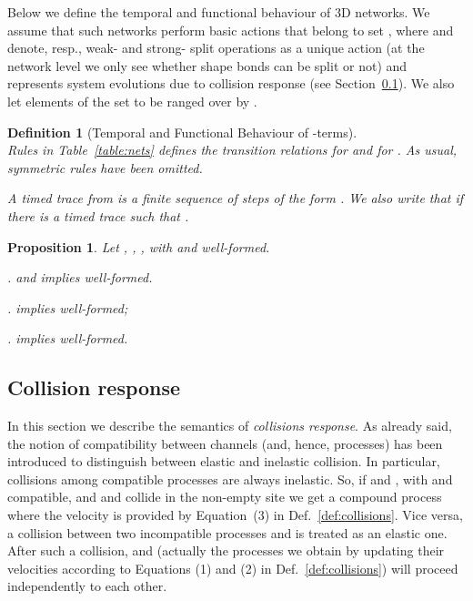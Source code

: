 \documentclass[11pt]{article}
\newtheorem{definition}{Definition}
\newtheorem{proposition}{Proposition}
\begin{document}
Below we define the temporal and functional behaviour of 3D networks. We assume that
such networks perform basic actions that belong to set , where  and  denote, resp., weak- and strong- split operations as a unique action (at the network level we only see whether shape bonds can be split or not) and  represents system evolutions due to collision response (see Section~\ref{sec:response}). We also let elements of the set  to be ranged over by .


\begin{definition}[Temporal and Functional Behaviour of -terms]\label{def:nets-behaviour}
\ \\ Rules in Table~\ref{table:nets} defines the transition relations   for  and  for . As usual, symmetric rules have been omitted.

A {\em timed trace} from   is a finite sequence of steps of the form . We also write that  if there is a timed trace
 such that .
\end{definition}


\begin{table}[th]

\caption{Temporal and functional behaviour of 3D networks}
\label{table:nets}
\end{table}


\begin{proposition}\label{prop:net-closure}
Let , , , with  and  well-formed.

\par\smallskip{}.  and  implies 
well-formed.

\par\smallskip{}.  implies  well-formed;

\par\medskip{}.  implies  well-formed.
\end{proposition}

\subsection{Collision response}\label{sec:response}

In this section we describe the semantics of {\em collisions response}. As already said, the notion of compatibility between channels (and, hence, processes) has been introduced to distinguish between elastic and inelastic collision. In particular, collisions among compatible processes are always inelastic. So, if  and , with  and  compatible, and  and  collide in the non-empty site  we get a compound process  where the velocity  is  provided by Equation~(3) in Def.~\ref{def:collisions}. Vice versa, a collision between two incompatible processes  and  is treated as an elastic one. After such a collision,  and  (actually the processes we obtain by updating their velocities according to Equations (1) and (2) in Def.~\ref{def:collisions}) will proceed independently to each other.
\end{document}
